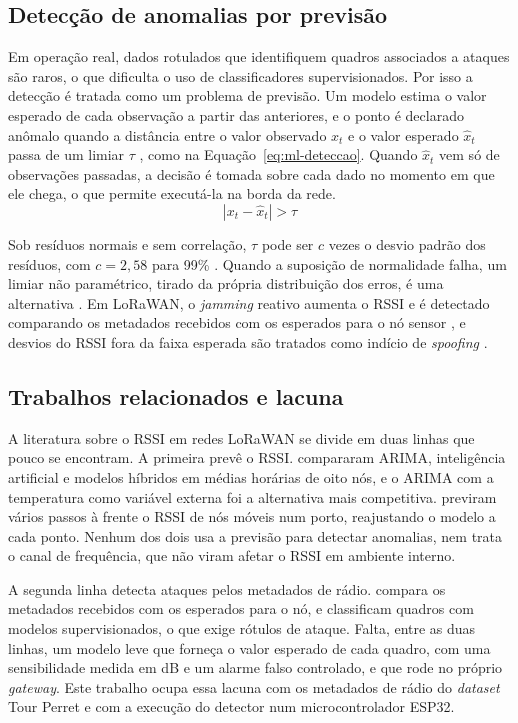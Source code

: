 \subsection{Detecção de anomalias por previsão}
\label{subsec:ml-deteccao}

Em operação real, dados rotulados que identifiquem quadros associados a
ataques são raros, o que dificulta o uso de classificadores supervisionados.
Por isso a detecção é tratada como um problema de previsão. Um modelo estima o
valor esperado de cada observação a partir das anteriores, e o ponto é
declarado anômalo quando a distância entre o valor observado $x_t$ e o valor
esperado $\hat{x}_t$ passa de um limiar $\tau$ \cite{blazquez2021review,
chalapathy2019}, como na Equação~\ref{eq:ml-deteccao}. Quando $\hat{x}_t$ vem
só de observações passadas, a decisão é tomada sobre cada dado no momento em
que ele chega, o que permite executá-la na borda da rede.
\begin{equation}
	\left| x_t - \hat{x}_t \right| > \tau
	\label{eq:ml-deteccao}
\end{equation}

Sob resíduos normais e sem correlação, $\tau$ pode ser $c$ vezes o desvio
padrão dos resíduos, com $c = 2{,}58$ para 99\% \cite{hyndman2021}. Quando a
suposição de normalidade falha, um limiar não paramétrico, tirado da própria
distribuição dos erros, é uma alternativa \cite{hundman2018spacecraft}. Em
LoRaWAN, o \textit{jamming} reativo aumenta o RSSI e é detectado comparando os
metadados recebidos com os esperados para o nó sensor
\cite{ruotsalainen2022jamming}, e desvios do RSSI fora da faixa esperada são
tratados como indício de \textit{spoofing} \cite{pourghasem2025spoofing}.

\subsection{Trabalhos relacionados e lacuna}
\label{subsec:ml-lacuna}

A literatura sobre o RSSI em redes LoRaWAN se divide em duas linhas que pouco se
encontram. A primeira prevê o RSSI. 
compararam ARIMA, inteligência artificial e modelos híbridos em médias horárias
de oito nós, e o ARIMA com a temperatura como variável externa foi a
alternativa mais competitiva.  previram vários
passos à frente o RSSI de nós móveis num porto, reajustando o modelo a cada
ponto. Nenhum dos dois usa a previsão para detectar anomalias, nem trata o
canal de frequência, que  não viram afetar o
RSSI em ambiente interno.

A segunda linha detecta ataques pelos metadados de rádio.
 compara os metadados recebidos com os
esperados para o nó, e  classificam quadros
com modelos supervisionados, o que exige rótulos de ataque. Falta, entre as duas
linhas, um modelo leve que forneça o valor esperado de cada quadro, com uma
sensibilidade medida em dB e um alarme falso controlado, e que rode no próprio
\textit{gateway}. Este trabalho ocupa essa lacuna com os metadados de rádio do
\textit{dataset} Tour Perret \cite{tourperret_dataset} e com a execução do
detector num microcontrolador ESP32.
